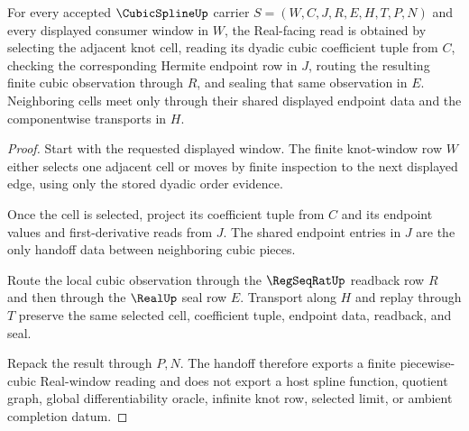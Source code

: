 \begin{theorem}
\label{thm:cubic-spline-real-window-piecewise-cubic-handoff}
For every accepted $\CubicSplineUp$ carrier $S=(W,C,J,R,E,H,T,P,N)$ and every displayed consumer window in $W$, the Real-facing read is obtained by selecting the adjacent knot cell, reading its dyadic cubic coefficient tuple from $C$, checking the corresponding Hermite endpoint row in $J$, routing the resulting finite cubic observation through $R$, and sealing that same observation in $E$. Neighboring cells meet only through their shared displayed endpoint data and the componentwise transports in $H$.
\end{theorem}
\begin{proof}
Start with the requested displayed window. The finite knot-window row $W$ either selects one adjacent cell or moves by finite inspection to the next displayed edge, using only the stored dyadic order evidence.

Once the cell is selected, project its coefficient tuple from $C$ and its endpoint values and first-derivative reads from $J$. The shared endpoint entries in $J$ are the only handoff data between neighboring cubic pieces.

Route the local cubic observation through the $\RegSeqRatUp$ readback row $R$ and then through the $\RealUp$ seal row $E$. Transport along $H$ and replay through $T$ preserve the same selected cell, coefficient tuple, endpoint data, readback, and seal.

Repack the result through $P,N$. The handoff therefore exports a finite piecewise-cubic Real-window reading and does not export a host spline function, quotient graph, global differentiability oracle, infinite knot row, selected limit, or ambient completion datum.
\end{proof}



